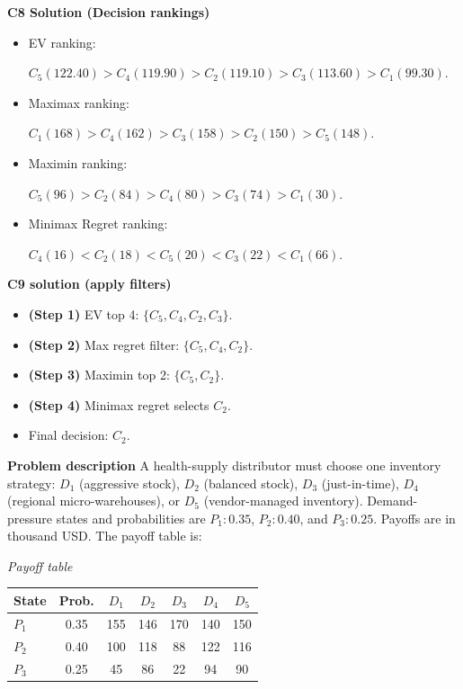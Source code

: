 \begin{ExamProblems}
		\textbf{C8 Solution (Decision rankings)}\par
		\begin{itemize}
			\item EV ranking: \par $C_5(122.40)>C_4(119.90)>C_2(119.10)>C_3(113.60)>C_1(99.30)$.
			\item Maximax ranking:\par $C_1(168)>C_4(162)>C_3(158)>C_2(150)>C_5(148)$.
			\item Maximin ranking: \par $C_5(96)>C_2(84)>C_4(80)>C_3(74)>C_1(30)$.
			\item Minimax Regret ranking:\par $C_4(16)<C_2(18)<C_5(20)<C_3(22)<C_1(66)$.
		\end{itemize}
		
		\textbf{C9 solution (apply filters)}\par
		\begin{itemize}
			\item \textbf{(Step 1)} EV top 4: $\{C_5,C_4,C_2,C_3\}$.
			\item \textbf{(Step 2)} Max regret filter: $\{C_5,C_4,C_2\}$.
			\item \textbf{(Step 3)} Maximin top 2: $\{C_5,C_2\}$.
			\item \textbf{(Step 4)} Minimax regret selects $C_2$.
			\item Final decision: $C_2$.
		\end{itemize}
		
		\newpage
		\item
		\textbf{Problem description}
		A health-supply distributor must choose one inventory strategy: $D_1$ (aggressive stock), $D_2$ (balanced stock), $D_3$ (just-in-time), $D_4$ (regional micro-warehouses), or $D_5$ (vendor-managed inventory).
		Demand-pressure states and probabilities are $P_1:0.35$, $P_2:0.40$, and $P_3:0.25$. Payoffs are in thousand USD. The payoff table is:
		
		\begin{center}
			\textit{Payoff table} \\
			\begin{tabular}{l c c c c c c}
				\hline
				State& Prob. & $D_1$ & $D_2$ & $D_3$ & $D_4$ & $D_5$ \\
				\hline
				$P_1$ & 0.35 & 155 & 146 & 170 & 140 & 150 \\
				$P_2$ & 0.40 & 100 & 118 & 88 & 122 & 116 \\
				$P_3$ & 0.25 & 45 & 86 & 22 & 94 & 90 \\
				\hline
			\end{tabular}
		\end{center}
		

\end{ExamProblems}
